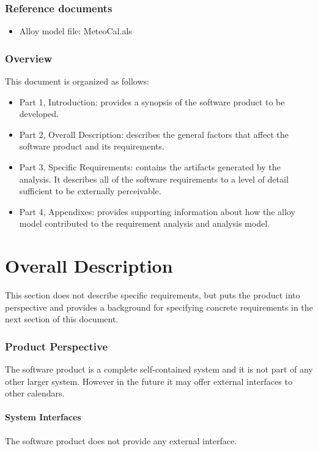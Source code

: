 \documentclass[10pt,a4paper,titlepage]{article}
\begin{document}
\section{Reference documents}
\begin{itemize}
\item Alloy model file: MeteoCal.als
\end{itemize}

\section{Overview}
This document is organized as follows:
\begin{itemize}
\item Part 1, Introduction: provides a synopsis of the software product to be developed.
\item Part 2, Overall Description: describes the general factors that affect the software product and its requirements.
\item Part 3, Specific Requirements: contains the artifacts generated by the analysis. It describes all of the software requirements to a level of detail sufficient to be externally perceivable.
\item Part 4, Appendixes: provides supporting information about how the alloy model contributed to the requirement analysis and analysis model.
\end{itemize}

\clearpage
\part{Overall Description}
This section does not describe specific requirements, but puts the product into perspective and provides a background for specifying concrete requirements in the next section of this document.

\section{Product Perspective}
The software product is a complete self-contained system and it is not part of any other larger system. However in the future it may offer external interfaces to other calendars.

\subsection{System Interfaces}
The software product does not provide any external interface.
\end{document}
